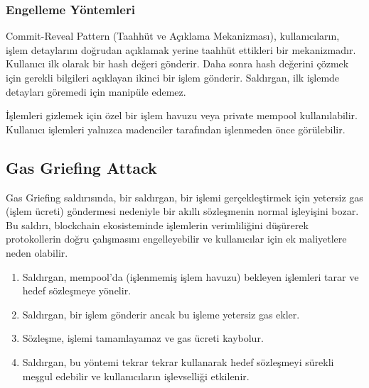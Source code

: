 \subsubsection{Engelleme Yöntemleri}

Commit-Reveal Pattern (Taahhüt ve Açıklama Mekanizması), kullanıcıların, işlem detaylarını doğrudan açıklamak yerine taahhüt ettikleri bir mekanizmadır. Kullanıcı ilk olarak bir hash değeri gönderir. Daha sonra hash değerini çözmek için gerekli bilgileri açıklayan ikinci bir işlem gönderir. Saldırgan, ilk işlemde detayları göremedi için manipüle edemez.

İşlemleri gizlemek için özel bir işlem havuzu veya private mempool kullanılabilir. Kullanıcı işlemleri yalnızca madenciler tarafından işlenmeden önce görülebilir.

\newpage

\subsection{Gas Griefing Attack}

Gas Griefing saldırısında, bir saldırgan, bir işlemi gerçekleştirmek için yetersiz gas (işlem ücreti) göndermesi nedeniyle bir akıllı sözleşmenin normal işleyişini bozar. Bu saldırı, blockchain ekosisteminde işlemlerin verimliliğini düşürerek protokollerin doğru çalışmasını engelleyebilir ve kullanıcılar için ek maliyetlere neden olabilir.

\begin{enumerate}
    \item Saldırgan, mempool’da (işlenmemiş işlem havuzu) bekleyen işlemleri tarar ve hedef sözleşmeye yönelir.
    \item Saldırgan, bir işlem gönderir ancak bu işleme yetersiz gas ekler.
    \item Sözleşme, işlemi tamamlayamaz ve gas ücreti kaybolur.
    \item Saldırgan, bu yöntemi tekrar tekrar kullanarak hedef sözleşmeyi sürekli meşgul edebilir ve kullanıcıların işlevselliği etkilenir.
\end{enumerate}

\newpage